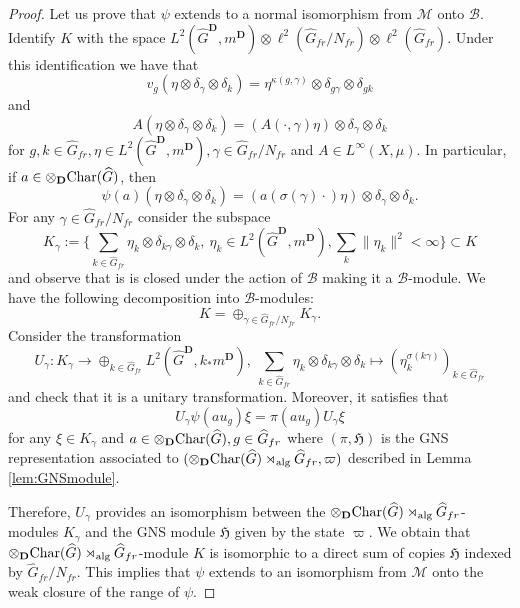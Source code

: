 \documentclass[a4paper,12pt]{amsart}
\numberwithin{equation}{section}
\theoremstyle{definition}
\DeclareMathOperator{\alg}{alg}
\newcommand{\scrB}{\mathscr B}
\newcommand{\Ch}{\textup{Char}}
\newcommand{\D}{\mathbf D}
\newcommand{\fH}{\mathfrak H}
\newcommand{\ga}{\gamma}
\newcommand{\scrM}{\mathscr M}
\newcommand{\ot}{\otimes}\newcommand{\otmin}{\otimes_{\text{min}}}
\newcommand{\wh}{\widehat}
\begin{document}
\begin{proof}
Let us prove that $\psi$ extends to a normal isomorphism from $\scrM$ onto $\scrB.$
Identify $K$ with the space $L^2({\wh G}^\D,m^\D)\ot \ell^2(\wh G_{fr}/N_{fr})\ot \ell^2(\wh G_{fr})$.
Under this identification we have that 
$$v_g(\eta\ot \delta_\ga\ot \delta_k) = \eta^{\kappa(g,\ga)} \ot \delta_{g\ga}\ot \delta_{gk}$$
and 
$$A(\eta\ot \delta_\ga\ot \delta_k) = (A(\cdot, \ga)\eta )\ot \delta_\ga\ot \delta_k$$
for $g,k\in \wh G_{fr}, \eta\in L^2({\wh G}^\D,m^\D), \ga\in \wh G_{fr}/N_{fr}$ and $A\in L^\infty(X,\mu).$
In particular, if $a\in \ot_\D \Ch(\wh G)$, then 
\begin{equation}\label{equa:A-module}\psi(a)(\eta\ot \delta_\ga\ot \delta_k) = (a(\sigma(\ga)\cdot )\eta )\ot \delta_\ga\ot \delta_k.\end{equation}
For any $\ga\in \wh G_{fr}/N_{fr}$ consider the subspace 
$$K_\ga:=  \{ \sum_{k\in \wh G_{fr}} \eta_k \ot \delta_{k\ga} \ot \delta_k , \ \eta_k\in L^2({\wh G}^\D,m^\D) , \sum_k  \| \eta_k\|^2<\infty \} \subset K $$
and observe that is is closed under the action of $\scrB$ making it a $\scrB$-module.
We have the following decomposition into $\scrB$-modules:
$$K=\oplus_{\ga\in \wh G_{fr}/N_{fr}} K_\ga.$$
Consider the transformation 
$$U_\ga: K_\ga \to \oplus_{k\in\wh G_{fr}} L^2({\wh G}^\D, k_*m^\D), \ \sum_{k\in\wh G_{fr}}\eta_k\ot\delta_{k\ga}\ot\delta_k \mapsto (\eta_{k} ^{\sigma(k\ga)})_{k\in\wh G_{fr}}$$
and check that it is a unitary transformation.
Moreover, it satisfies that 
$$U_\ga \psi(au_g) \xi =\pi( a u_g) U_\ga \xi$$ for any $\xi\in K_\ga$ and $a\in \ot_\D \Ch(\wh G), g\in\wh G_{fr}$ where $(\pi,\fH)$ is the GNS representation associated to $(\ot_\D\Ch(\wh G)\rtimes_{\alg}\wh G_{fr},\varpi)$ described in Lemma \ref{lem:GNSmodule}.

Therefore, $U_\ga$ provides an isomorphism between the $\ot_\D \Ch(\wh G)\rtimes_{\alg} \wh G_{fr}$-modules $K_\ga$ and the GNS module $\fH$ given by the state $\varpi$.
We obtain that $\ot_\D\Ch(\wh G)\rtimes_{\alg}\wh G_{fr}$-module $K$ is isomorphic to a direct sum of copies $\fH$ indexed by $\wh G_{fr}/N_{fr}$. 
This implies that $\psi$ extends to an isomorphism from $\scrM$ onto the weak closure of the range of $\psi.$


\end{proof}
\end{document}
